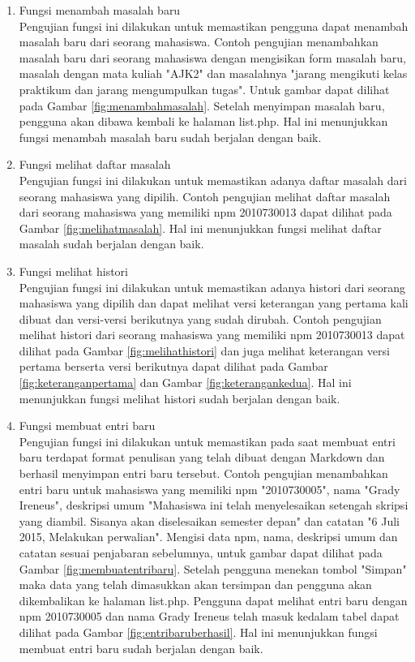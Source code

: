 \begin{enumerate}[(1)]
\item Fungsi menambah masalah baru\\
    Pengujian fungsi ini dilakukan untuk memastikan pengguna dapat menambah masalah baru dari seorang mahasiswa. Contoh pengujian menambahkan masalah baru dari seorang mahasiswa dengan mengisikan form masalah baru, masalah dengan mata kuliah "AJK2" dan masalahnya "jarang mengikuti kelas praktikum dan jarang mengumpulkan tugas". Untuk gambar dapat dilihat pada Gambar \ref{fig:menambahmasalah}. Setelah menyimpan masalah baru, pengguna akan dibawa kembali ke halaman list.php. Hal ini menunjukkan fungsi menambah masalah baru sudah berjalan dengan baik.

\item Fungsi melihat daftar masalah\\
    Pengujian fungsi ini dilakukan untuk memastikan adanya daftar masalah dari seorang mahasiswa yang dipilih. Contoh pengujian melihat daftar masalah dari seorang mahasiswa yang memiliki npm 2010730013 dapat dilihat pada Gambar \ref{fig:melihatmasalah}. Hal ini menunjukkan fungsi melihat daftar masalah sudah berjalan dengan baik.

\item Fungsi melihat histori\\
	Pengujian fungsi ini dilakukan untuk memastikan adanya histori dari seorang mahasiswa yang dipilih dan dapat melihat versi keterangan yang pertama kali dibuat dan versi-versi berikutnya yang sudah dirubah. Contoh pengujian melihat histori dari seorang mahasiswa yang memiliki npm 2010730013 dapat dilihat pada Gambar \ref{fig:melihathistori} dan juga melihat keterangan versi pertama berserta versi berikutnya dapat dilihat pada Gambar \ref{fig:keteranganpertama} dan Gambar \ref{fig:keterangankedua}. Hal ini menunjukkan fungsi melihat histori sudah berjalan dengan baik.
	
\item Fungsi membuat entri baru\\
	Pengujian fungsi ini dilakukan untuk memastikan pada saat membuat entri baru terdapat format penulisan yang telah dibuat dengan Markdown dan berhasil menyimpan entri baru tersebut. Contoh pengujian menambahkan entri baru untuk mahasiswa yang memiliki npm "2010730005", nama "Grady Ireneus", deskripsi umum "Mahasiswa ini telah menyelesaikan setengah skripsi yang diambil. Sisanya akan diselesaikan semester depan" dan catatan "6 Juli 2015, Melakukan perwalian". Mengisi data npm, nama, deskripsi umum dan catatan sesuai penjabaran sebelumnya, untuk gambar dapat dilihat pada Gambar \ref{fig:membuatentribaru}. Setelah pengguna menekan tombol "Simpan" maka data yang telah dimasukkan akan tersimpan dan pengguna akan dikembalikan ke halaman list.php. Pengguna dapat melihat entri baru dengan npm 2010730005 dan nama Grady Ireneus telah masuk kedalam tabel dapat dilihat pada Gambar \ref{fig:entribaruberhasil}. Hal ini menunjukkan fungsi membuat entri baru sudah berjalan dengan baik.
	

\end{enumerate}

